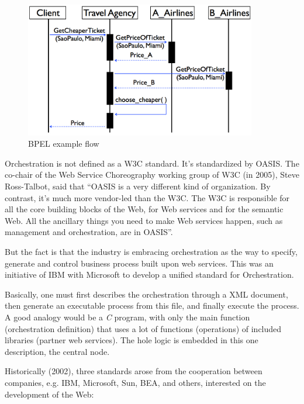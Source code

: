 \begin{figure}[htb]
  \centering
  \includegraphics[width=0.9\textwidth]{images/BPELexample}
  \caption{BPEL example flow}
  \label{BPELexample}
\end{figure}

Orchestration is not defined as a W3C standard. It's standardized by OASIS. The co-chair of the Web Service Choreography working group of W3C (in 2005), Steve Ross-Talbot, said that ``OASIS is a very different kind of organization. By contrast, it's much more vendor-led than the W3C. The W3C is responsible for all the core building blocks of the Web, for Web services and for the semantic Web. All the ancillary things you need to make Web services happen, such as management and orchestration, are in OASIS''. \citep{INTERVIEW}

But the fact is that the industry is embracing orchestration as the way to specify, generate and control business process built upon web services. This was an initiative of IBM with Microsoft to develop a unified standard for Orchestration.

Basically, one must first describes the orchestration through a XML document, then generate an executable process from this file, and finally execute the process. A good analogy would be a \emph{C} program, with only the main function (orchestration definition) that uses a lot of functions (operations) of included libraries (partner web services). The hole logic is embedded in this one description, the central node. 

Historically (2002), three standards arose from the cooperation between companies, e.g. IBM, Microsoft, Sun, BEA, and others, interested on the development of the Web:

